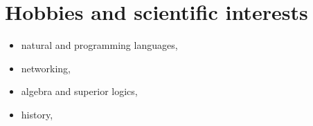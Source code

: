 \documentclass[a4paper,12pt,openany]{article}
\begin{document}
\section{Hobbies and scientific interests}
	\begin{itemize}
		\item natural and programming languages,
		\item networking,
		\item algebra and superior logics,
		\item history, 
	\end{itemize}
\end{document}
